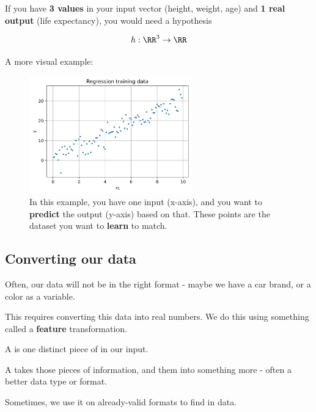         \miniex If you have \textbf{3 values} in your input vector (height, weight, age) and \textbf{1 real output} (life expectancy), you would need a hypothesis
        
        \begin{equation*}
            h: \RR^3 \rightarrow \RR
        \end{equation*}
        
        A more visual example:
        
        \begin{figure}[H]
        \centering
            \includegraphics[width=70mm,scale=0.5]{images/regression_images/Regression_Training_Data.png}
        
            \caption*{In this example, you have one input (x-axis), and you want to \textbf{predict} the output (y-axis) based on that. These points are the dataset you want to \textbf{learn} to match.}
        \end{figure}
        
    \subsection{Converting our data}
    
        Often, our data will not be in the right format - maybe we have a car brand, or a color as a variable.
        
        This requires converting this data into real numbers. We do this using something called a \textbf{feature} transformation.\\
        
        \begin{definition}
            A  is one distinct piece of  in our input.
            
            A  takes those pieces of information, and  them into something more  - often a better data type or format.
            
            Sometimes, we use it on already-valid formats to find  in data.
        \end{definition}
        

